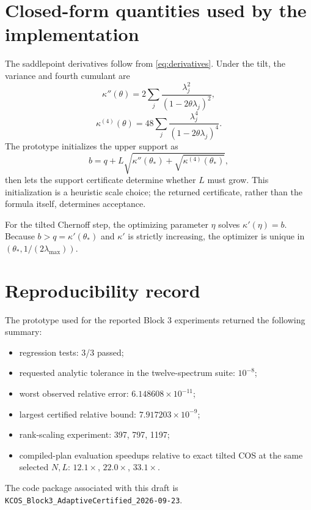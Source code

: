 \documentclass[11pt]{article}
\theoremstyle{definition}
\begin{document}
\appendix
\section{Closed-form quantities used by the implementation}

The saddlepoint derivatives follow from \eqref{eq:derivatives}. Under the tilt, the variance and fourth cumulant are
\[
\kappa''(\theta)
=2\sum_j\frac{\lambda_j^2}{(1-2\theta\lambda_j)^2},
\]
\[
\kappa^{(4)}(\theta)
=48\sum_j\frac{\lambda_j^4}{(1-2\theta\lambda_j)^4}.
\]
The prototype initializes the upper support as
\[
b=q+L\sqrt{\kappa''(\theta_*)+\sqrt{\kappa^{(4)}(\theta_*)}},
\]
then lets the support certificate determine whether $L$ must grow. This initialization is a heuristic scale choice; the returned certificate, rather than the formula itself, determines acceptance.

For the tilted Chernoff step, the optimizing parameter $\eta$ solves $\kappa'(\eta)=b$. Because $b>q=\kappa'(\theta_*)$ and $\kappa'$ is strictly increasing, the optimizer is unique in $(\theta_*,1/(2\lambda_{\max}))$.

\section{Reproducibility record}

The prototype used for the reported Block 3 experiments returned the following summary:
\begin{itemize}
\item regression tests: 3/3 passed;
\item requested analytic tolerance in the twelve-spectrum suite: $10^{-8}$;
\item worst observed relative error: $6.148608\times10^{-11}$;
\item largest certified relative bound: $7.917203\times10^{-9}$;
\item rank-scaling experiment: 397, 797, 1197;
\item compiled-plan evaluation speedups relative to exact tilted COS at the same selected $N,L$: $12.1\times$, $22.0\times$, $33.1\times$.
\end{itemize}
The code package associated with this draft is \texttt{KCOS\_Block3\_AdaptiveCertified\_2026-09-23}.
\end{document}
